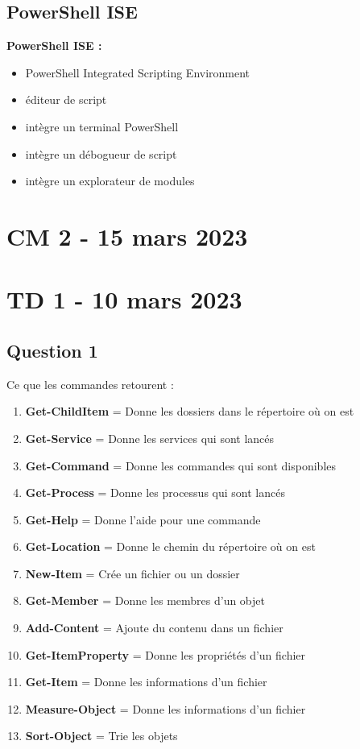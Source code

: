 \documentclass[12pt, a4paper]{article}
\begin{document}
\subsection{PowerShell ISE}
\textbf{PowerShell ISE :}\\

    \begin{itemize}
        \item PowerShell Integrated Scripting Environment
        \item éditeur de script
        \item intègre un terminal PowerShell
        \item intègre un débogueur de script
        \item intègre un explorateur de modules\\
    \end{itemize}

\newpage
\section{CM 2 - 15 mars 2023}



\newpage
\section{TD 1 - 10 mars 2023}
\subsection{Question 1}
Ce que les commandes retourent :\\
\begin{enumerate}
    \item \textbf{Get-ChildItem} = Donne les dossiers dans le répertoire où on est 
    \item \textbf{Get-Service} = Donne les services qui sont lancés
    \item \textbf{Get-Command} = Donne les commandes qui sont disponibles
    \item \textbf{Get-Process} = Donne les processus qui sont lancés
    \item \textbf{Get-Help} = Donne l'aide pour une commande
    \item \textbf{Get-Location} = Donne le chemin du répertoire où on est
    \item \textbf{New-Item} = Crée un fichier ou un dossier
    \item \textbf{Get-Member} = Donne les membres d'un objet
    \item \textbf{Add-Content} = Ajoute du contenu dans un fichier
    \item \textbf{Get-ItemProperty} = Donne les propriétés d'un fichier
    \item \textbf{Get-Item} = Donne les informations d'un fichier
    \item \textbf{Measure-Object} = Donne les informations d'un fichier
    \item \textbf{Sort-Object} = Trie les objets
\end{enumerate}
\end{document}
